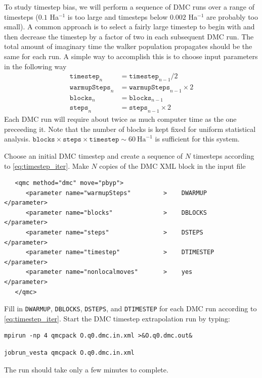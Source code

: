 To study timestep bias, we will perform a sequence of DMC runs over a range of timesteps ($0.1$ Ha$^{-1}$ is too large and timesteps below $0.002$ Ha$^{-1}$ are probably too small).  A common approach is to select a fairly large timestep to begin with and then decrease the timestep by a factor of two in each subsequent DMC run.  The total amount of imaginary time the walker population propagates should be the same for each run.  A simple way to accomplish this is to choose input parameters in the following way
\begin{align}\label{eq:timestep_iter}
  \texttt{timestep}_{n}    &= \texttt{timestep}_{n-1}/2\nonumber\\
  \texttt{warmupSteps}_{n} &= \texttt{warmupSteps}_{n-1}\times 2\nonumber\\
  \texttt{blocks}_{n}      &= \texttt{blocks}_{n-1}\nonumber\\
  \texttt{steps}_{n}       &= \texttt{steps}_{n-1}\times 2
\end{align}
Each DMC run will require about twice as much computer time as the one preceeding it.  Note that the number of blocks is kept fixed for uniform statistical analysis.  $\texttt{blocks}\times\texttt{steps}\times\texttt{timestep}\sim 60~\mathrm{Ha}^{-1}$ is sufficient for this system.

Choose an initial DMC timestep and create a sequence of $N$ timesteps according to \ref{eq:timestep_iter}.  Make $N$ copies of the DMC XML block in the input file
\begin{lstlisting}
   <qmc method="dmc" move="pbyp">
      <parameter name="warmupSteps"         >    DWARMUP         </parameter>
      <parameter name="blocks"              >    DBLOCKS         </parameter>
      <parameter name="steps"               >    DSTEPS          </parameter>
      <parameter name="timestep"            >    DTIMESTEP       </parameter>
      <parameter name="nonlocalmoves"       >    yes             </parameter>
   </qmc>
\end{lstlisting}
\noindent
Fill in \texttt{DWARMUP}, \texttt{DBLOCKS}, \texttt{DSTEPS}, and \texttt{DTIMESTEP} for each DMC run according to \ref{eq:timestep_iter}.  Start the DMC timestep extrapolation run by typing:  
\ifws
\begin{shaded}
\begin{verbatim}
mpirun -np 4 qmcpack O.q0.dmc.in.xml >&O.q0.dmc.out&
\end{verbatim}
\end{shaded}
\else
\begin{shaded}
\begin{verbatim}
jobrun_vesta qmcpack O.q0.dmc.in.xml
\end{verbatim}
\end{shaded}
\fi
\noindent
The run should take only a few minutes to complete.

